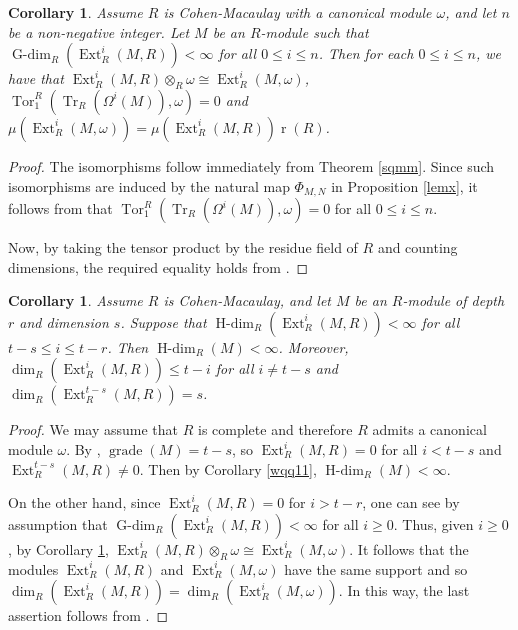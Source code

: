 \documentclass[11pt, a4paper,pagebackref]{amsart}
\numberwithin{equation}{section}
\newtheorem{corollary}[theorem]{Corollary}
\theoremstyle{definition}
\newtheorem{remark and definition}[theorem]{Remark and Definition}
\newtheorem{remark and notation}[theorem]{Remark and Notation}
\newcommand\Ext{\operatorname{Ext}}
\DeclareMathOperator{\type}{r}
\begin{document}
\begin{corollary}
    \label{rfg}
    Assume $R$ is Cohen-Macaulay with a canonical module $\omega$, and let $n$ be a non-negative integer. Let $M$ be an $R$-module such that $\operatorname{G-dim}_R(\Ext_R^i(M,R))<\infty$ for all $0\leq i \leq n$. Then for each $0\leq i \leq n$, we have that $\Ext_R^i(M,R) \otimes_R \omega \cong \Ext_R^i(M, \omega)$, $\operatorname{Tor}^R_1(\operatorname{Tr}_R(\Omega^i(M)), \omega)=0$ and $\mu(\Ext^i_R(M,\omega))=\mu(\Ext^i_R(M,R))\type(R)$.  
\end{corollary}
\begin{proof}
  The isomorphisms follow immediately from Theorem \ref{sqmm}. Since such isomorphisms are induced by the natural map $\Phi_{M,N}$ in Proposition \ref{lemx}, it follows from \cite[Theorem 2.8(b)]{Stablemoduletheory} that $\operatorname{Tor}^R_1(\operatorname{Tr}_R(\Omega^i(M)), \omega)=0$ for all $0 \leq i \leq n$.

 Now, by taking the tensor product by the residue field of $R$ and counting dimensions, the required equality holds from \cite[Proposition 3.3.11(c)]{bruns}. 
\end{proof}



\begin{corollary}\label{sqrqqw}
    Assume $R$ is Cohen-Macaulay, and let $M$ be an $R$-module of depth $r$ and dimension $s$. Suppose that $\operatorname{H-dim}_R(\Ext_R^i(M,R))<\infty$ for all $t-s\leq i \leq t-r$. Then $\operatorname{H-dim}_R (M)<\infty$. Moreover, $\operatorname{dim}_R(\Ext_R^i(M, R))\leq t-i$ for all $i\neq t-s$ and $\dim_R(\Ext^{t-s}_R(M, R))=s$. 
\end{corollary}

\begin{proof} We may assume that $R$ is complete and therefore $R$ admits a canonical module $\omega$. By \cite[Corollary 2.1.4]{bruns}, $\operatorname{grade}(M)=t-s$, so $\Ext_R^i(M,R)=0$ for all $i<t-s$ and $\Ext_R^{t-s}(M,R)\not=0$. Then by Corollary \ref{wqq11}, $\operatorname{H-dim}_R (M)<\infty$. 

        
On the other hand, since  $\Ext_R^i(M, R)=0$ for $i>t-r$, one can see by assumption that $\operatorname{G-dim}_R(\Ext_R^i(M,R))<\infty$ for all $i\geq 0$. Thus, given $i\geq 0$,  by Corollary \ref{rfg}, $ \Ext_R^i(M,R) \otimes_R \omega \cong \Ext_R^i(M, \omega).$
    It follows that the modules $\Ext^i_R(M, R)$ and $\Ext^i_R(M, \omega)$ have the same support and so $\dim_R(\Ext_R^i(M,R))=\dim_R(\Ext_R^i(M, \omega))$. In this way, the last assertion  follows from \cite[Lemma 1.9 a) and c)]{Sch98}.
\end{proof}
\end{document}
